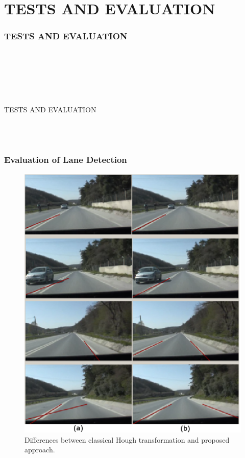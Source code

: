 \documentclass{beamer}
\newcommand{\mysectionpage}[2]{
	\begin{frame}
		\frametitle{#1}
		~\\~
		\begin{block}{}
			~\\~
			\begin{center}
				#2
			\end{center}
			~\\~
		\end{block}
	\end{frame}
}
\begin{document}
\section{TESTS AND EVALUATION}
\mysectionpage{TESTS AND EVALUATION}{TESTS AND EVALUATION}

\begin{frame}
	\frametitle{Evaluation of Lane Detection} 
	\begin{figure}[ht]
	\begin{center}
	\includegraphics[height=.6\paperheight]{../img/ldfig4.eps}
	\caption{Differences between classical Hough transformation and proposed approach.}
	\label{fig:ldfig4}
	\end{center}
	\end{figure}
\end{frame}
\end{document}
